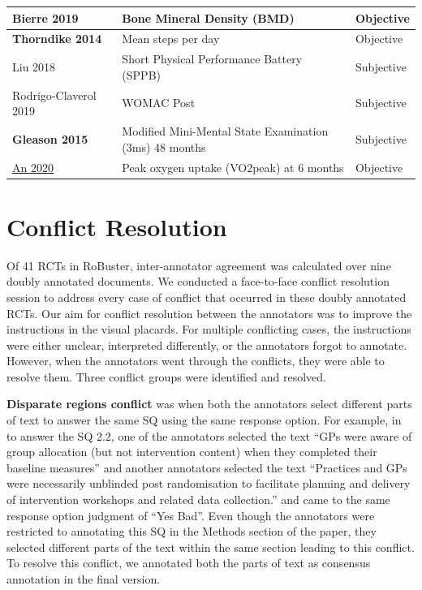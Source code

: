 \documentclass[sn-mathphys,Numbered]{sn-jnl}%
\begin{document}
\begin{longtable}{|p{4.2cm}|p{5.2cm}|p{1.9cm}|}
\hline
Bierre 2019~\cite{bjerre2019community} & Bone Mineral Density (BMD) & Objective \\
\hline
\textbf{Thorndike 2014}~\cite{thorndike2014activity} & Mean steps per day & Objective \\
\hline
Liu 2018~\cite{liu2018effect}  & Short Physical Performance Battery (SPPB) & Subjective \\
\hline
Rodrigo-Claverol 2019~\cite{rodrigo2019animal} & WOMAC Post & Subjective \\
\hline
\textbf{Gleason 2015}~\cite{gleason2015effects} & Modified Mini-Mental State Examination (3ms) 48 months & Subjective \\
\hline
\underline{An 2020}~\cite{an2020patterns} & Peak oxygen uptake (VO2peak) at 6 months & Objective \\
\hline
\end{longtable}
%
%
%
\section*{Conflict Resolution}
\label{conflict}
%
Of 41 RCTs in RoBuster, inter-annotator agreement was calculated over nine doubly annotated documents.
We conducted a face-to-face conflict resolution session to address every case of conflict that occurred in these doubly annotated RCTs.
Our aim for conflict resolution between the annotators was to improve the instructions in the visual placards.
For multiple conflicting cases, the instructions were either unclear, interpreted differently, or the annotators forgot to annotate.
However, when the annotators went through the conflicts, they were able to resolve them.
Three conflict groups were identified and resolved.

\textbf{Disparate regions conflict} was when both the annotators select different parts of text to answer the same SQ using the same response option.
For example, in~\cite{darlow2019fear} to answer the SQ 2.2, one of the annotators selected the text ``GPs were aware of group allocation (but not intervention content) when they completed their baseline measures'' and another annotators selected the text ``Practices and GPs were necessarily unblinded post randomisation to facilitate planning and delivery of intervention workshops and related data collection.'' and came to the same response option judgment of ``Yes Bad''.
Even though the annotators were restricted to annotating this SQ in the Methods section of the paper, they selected different parts of the text within the same section leading to this conflict.
To resolve this conflict, we annotated both the parts of text as consensus annotation in the final version.
\end{document}
